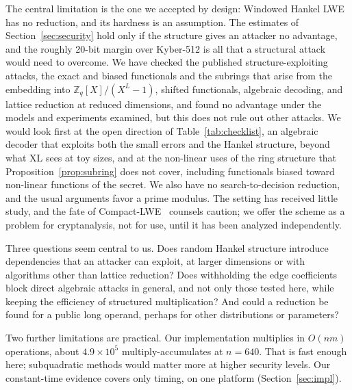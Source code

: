 \documentclass[11pt,a4paper]{article}
\theoremstyle{definition}
\newcommand{\Zq}{\mathbb{Z}_q}
\begin{document}
The central limitation is the one we accepted by design: Windowed Hankel LWE has no reduction, and its hardness is an assumption. The estimates of Section~\ref{sec:security} hold only if the structure gives an attacker no advantage, and the roughly 20-bit margin over Kyber-512 is all that a structural attack would need to overcome. We have checked the published structure-exploiting attacks, the exact and biased functionals and the subrings that arise from the embedding into $\Zq[X]/(X^L - 1)$, shifted functionals, algebraic decoding, and lattice reduction at reduced dimensions, and found no advantage under the models and experiments examined, but this does not rule out other attacks. We would look first at the open direction of Table~\ref{tab:checklist}, an algebraic decoder that exploits both the small errors and the Hankel structure, beyond what XL sees at toy sizes, and at the non-linear uses of the ring structure that Proposition~\ref{prop:subring} does not cover, including functionals biased toward non-linear functions of the secret. We also have no search-to-decision reduction, and the usual arguments favor a prime modulus. The setting has received little study, and the fate of Compact-LWE~\cite{bootle2018compact} counsels caution; we offer the scheme as a problem for cryptanalysis, not for use, until it has been analyzed independently.

Three questions seem central to us. Does random Hankel structure introduce dependencies that an attacker can exploit, at larger dimensions or with algorithms other than lattice reduction? Does withholding the edge coefficients block direct algebraic attacks in general, and not only those tested here, while keeping the efficiency of structured multiplication? And could a reduction be found for a public long operand, perhaps for other distributions or parameters?

Two further limitations are practical. Our implementation multiplies in $O(nm)$ operations, about $4.9 \times 10^5$ multiply-accumulates at $n = 640$. That is fast enough here; subquadratic methods would matter more at higher security levels. Our constant-time evidence covers only timing, on one platform (Section~\ref{sec:impl}).

\end{document}
